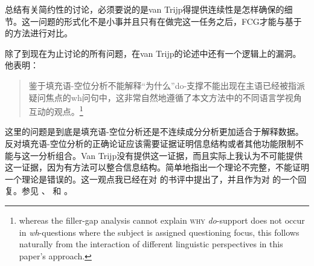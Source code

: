 总结有关简约性的讨论，必须要说的是van Trijp得提供连续性是怎样确保的细节。这一问题的形式化不是小事并且只有在做完这一任务之后，FCG才能与基于\slaschc 的方法进行对比。

除了到现在为止讨论的所有问题，在van Trijp的论述中还有一个逻辑上的漏洞。他表明：
\begin{quotation}
鉴于填充语-空位分析不能解释“为什么”do-支撑不能出现在主语已经被指派疑问焦点的wh问句中，这非常自然地遵循了本文方法中的不同语言学视角互动的观点。\citep[]{vanTrijp2014a}\footnote{%
whereas the filler-gap analysis cannot explain \textsc{why} \emph{do}-support does not occur
  in \emph{wh}-questions where the subject is assigned questioning focus, this follows naturally
from the interaction of different linguistic perspectives in this paper's
approach.}
\end{quotation}
这里的问题是到底是填充语-空位分析还是不连续成分分析更加适合于解释数据。反对填充语-空位分析的正确论证应该需要证据证明信息结构或者其他功能限制不能与这一分析组合。Van Trijp没有提供这一证据，而且实际上我认为不可能提供这一证据，因为有方法可以整合信息结构。简单地指出一个理论不完整，不能证明一个理论是错误的。这一观点我已经在对 的书评中提出了，并且作为对 \citet{Boas2014a}的一个回复。参见 、 和 。

